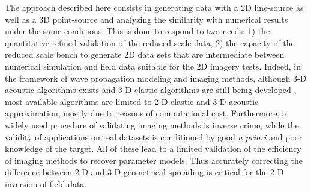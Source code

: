 \documentclass[paper,extra]{gji} %
\newcommand{\twod}{2-D }
\newcommand{\thrd}{3-D }
\begin{document}
\noindent The approach described here consists in generating data with a 2D line-source as well as a 3D point-source and analyzing the similarity with numerical results under the same conditions. This is done to respond to two needs: 1) the quantitative refined validation of the reduced scale data, 2) the capacity of the reduced scale bench to generate 2D data sets that are intermediate between numerical simulation and field data suitable for the 2D imagery tests. Indeed, in the framework of wave propagation modeling and imaging methods, although \thrd acoustic algorithms exists \citep{benhadjali_FWI_2008,plessix_FWI_2010} and \thrd elastic algorithms are still being developed \citep{castellanos_AMD_2011,Borisov_FWI_2015}, most available algorithms are limited to \twod elastic and \thrd acoustic approximation, mostly due to reasons of computational cost. Furthermore, a widely used procedure of validating imaging methods is inverse crime, while the validity of applications on real datasets is conditioned by good \textit{a priori} and poor knowledge of the target. All of these lead to a limited validation of the efficiency of imaging methods to recover parameter models. Thus accurately correcting the difference between \twod and \thrd geometrical spreading is critical for the \twod inversion of field data.


\end{document}
